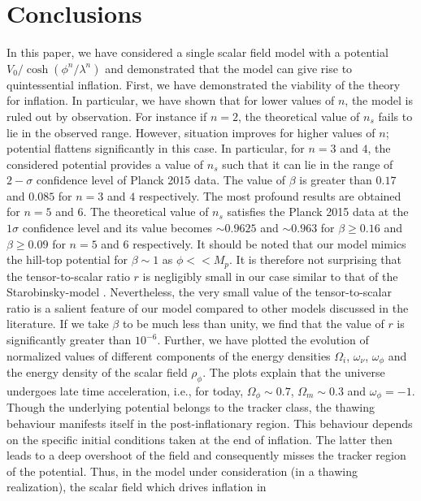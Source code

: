 \documentclass[prd,twocolumn,superscriptaddress]{revtex4}
\begin{document}
 \section{Conclusions}
 In this paper, we have considered a single scalar field model  with a potential $V_0/\cosh{\left(\phi^n/\lambda^n\right)}$ and demonstrated that the model can give
 rise to quintessential inflation. First, we have demonstrated the viability of the theory for inflation. In particular, we have shown that for lower  values of  $n$, the model is ruled out by observation. For instance if $n=2$, the theoretical value of $n_s$  fails to lie in the
 observed range. However, situation improves for higher values of $n$; potential  flattens significantly in this case. In particular, for $n=3$ and $4$, the considered potential provides
 a value of $n_s$ such that it can lie in the range of $2- \sigma$ confidence level of Planck 2015 data. The value of $\beta$ is greater than $0.17$ and
 $0.085$  for $n=3$ and $4$ respectively. The most profound results are obtained for $n=5$ and $6$. The theoretical value of $n_s$ satisfies
 the  Planck 2015 data at the $1 \sigma$ 
confidence level and its value becomes $\sim 0.9625$ and  $\sim 0.963$ for $\beta  \geq0 .16$ and
 $\beta \geq 0 .09$ for  $n=5$ and $6$ respectively. It should be noted that our model mimics the hill-top potential \cite{LythontheHilltop} for
 $\beta \sim 1$ as $\phi<<M_p$. It is therefore not surprising that  the tensor-to-scalar ratio $r$  is negligibly small 
 in our case similar to that of the Starobinsky-model \cite{Starobinsky:1980}.  Nevertheless, the very small value of the tensor-to-scalar
 ratio is a salient feature of our model compared to other models discussed in the literature.
 If we take $\beta$ to be much less than unity, we find that the value of $r$ is significantly greater than $10^{-6}$. Further, we
 have  plotted the evolution of normalized values  of
 different components of the energy densities $\Omega_i$, $\omega_{\nu}$, $\omega_{\phi}$ and the energy density of the scalar field $\rho_{\phi}$.
 The plots explain that the universe undergoes late time acceleration, i.e., for today, $\Omega_{\phi} \sim0.7$, $\Omega_{m} \sim 0.3$ and
 $\omega_{\phi} = -1$. Though the underlying potential belongs to the tracker class, the thawing behaviour manifests itself in the post-inflationary
 region. This behaviour depends on the specific initial conditions taken at the end of inflation. The latter
 then leads to a deep overshoot of the field and  consequently misses the tracker region of the potential.
 Thus, in the model under consideration (in a thawing realization), the scalar field which drives inflation in
\end{document}
